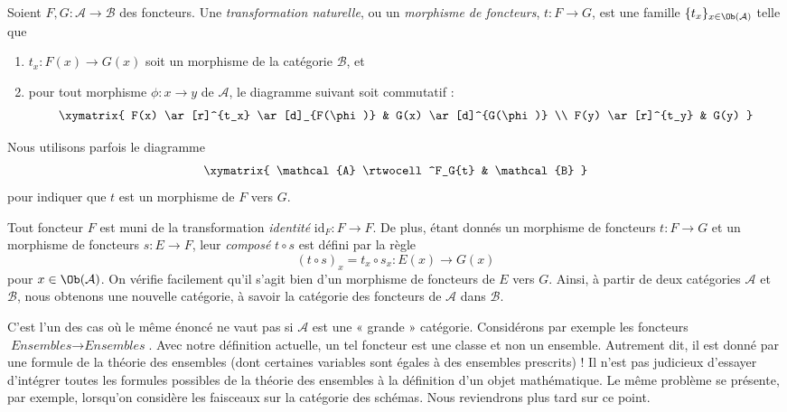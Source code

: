 \begin{definition}
\label{definition-transformation-functors}
Soient $F, G : \mathcal{A} \to \mathcal{B}$ des foncteurs.
Une {\it transformation naturelle}, ou un {\it morphisme de foncteurs},
$t : F \to G$, est une famille $\{t_x\}_{x\in \Ob(\mathcal{A})}$
telle que
\begin{enumerate}
\item $t_x : F(x) \to G(x)$ soit un morphisme de la catégorie $\mathcal{B}$, et
\item pour tout morphisme $\phi : x \to y$ de $\mathcal{A}$, le diagramme
suivant soit commutatif :
$$
\xymatrix{
F(x) \ar[r]^{t_x} \ar[d]_{F(\phi)} & G(x) \ar[d]^{G(\phi)} \\
F(y) \ar[r]^{t_y} & G(y) }
$$
\end{enumerate}
\end{definition}

\noindent
Nous utilisons parfois le diagramme
$$
\xymatrix{
\mathcal{A}
\rtwocell^F_G{t}
&
\mathcal{B}
}
$$
pour indiquer que $t$ est un morphisme de $F$ vers $G$.

\medskip\noindent
Tout foncteur $F$ est muni de la transformation
{\it identité} $\text{id}_F : F \to F$. De plus, étant donnés un morphisme de
foncteurs $t : F \to G$ et un morphisme de foncteurs $s : E \to F$,
leur {\it composé} $t \circ s$ est défini par la règle
$$
(t \circ s)_x = t_x \circ s_x : E(x) \to G(x)
$$
pour $x \in \Ob(\mathcal{A})$.
On vérifie facilement qu'il s'agit bien d'un morphisme de foncteurs
de $E$ vers $G$.
Ainsi, à partir de deux catégories
$\mathcal{A}$ et $\mathcal{B}$, nous obtenons une nouvelle catégorie,
à savoir la catégorie des foncteurs de $\mathcal{A}$ dans $\mathcal{B}$.

\begin{remark}
\label{remark-functors-sets-sets}
C'est l'un des cas où le même énoncé ne vaut pas si
$\mathcal{A}$ est une « grande » catégorie. Considérons par exemple les
foncteurs $\textit{Ensembles} \to \textit{Ensembles}$. Avec notre définition actuelle,
un tel foncteur est une classe et non un ensemble. Autrement dit, il est
donné par une formule de la théorie des ensembles (dont certaines variables
sont égales à des ensembles prescrits) ! Il n'est pas judicieux d'essayer
d'intégrer toutes les formules possibles de la théorie des ensembles à la
définition d'un objet mathématique. Le même problème se présente, par exemple,
lorsqu'on considère les faisceaux sur la catégorie des schémas.
Nous reviendrons plus tard sur ce point.
\end{remark}

